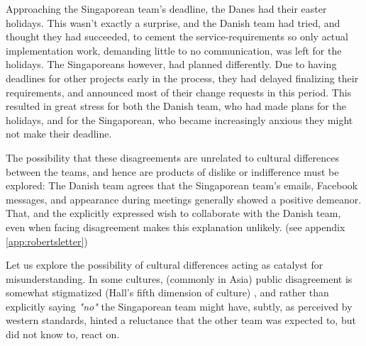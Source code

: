 Approaching the Singaporean team's deadline, the Danes had their easter
holidays. This wasn't exactly a surprise, and the Danish team had tried, and
thought they had succeeded, to cement the service-requirements so only actual
implementation work, demanding little to no communication, was left for the
holidays. The Singaporeans however, had planned differently. Due to having deadlines
for other projects early in the process, they had delayed finalizing their
requirements, and announced most of their change requests in this period. This
resulted in great stress for both the Danish team, who had made plans for the
holidays, and for the Singaporean, who became increasingly anxious they might not
make their deadline.

The possibility that these disagreements are unrelated to cultural differences
between the teams, and hence are products of dislike or indifference must be
explored: The Danish team agrees that the Singaporean team's emails, Facebook messages,
and appearance during meetings generally showed a positive demeanor. That, and
the explicitly expressed wish to collaborate with the Danish team, even when
facing disagreement makes this explanation unlikely. (see appendix
\ref{app:robertsletter})

Let us explore the possibility of cultural differences acting as catalyst for
misunderstanding. In some cultures, (commonly in Asia) public disagreement is
somewhat stigmatized (Hall's fifth dimension of culture\cite{surprises})
\cite{herbsiemens}, and rather than explicitly saying \emph{"no"} the Singaporean team
might have, subtly, as perceived by western standards, hinted a reluctance that
the other team was expected to, but did not know to, react on.

